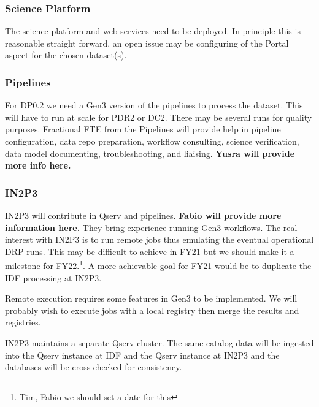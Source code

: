 \subsubsection{ Science Platform}
The science platform and web services need to be deployed. In principle this is reasonable straight forward, an open issue may be configuring of the Portal aspect for the chosen  dataset(s).

\subsubsection{ Pipelines }
For DP0.2 we need a Gen3 version of the pipelines to process the dataset. This will have to run at scale for PDR2 or DC2. There may be several runs for quality purposes.
Fractional FTE from the Pipelines will provide help in pipeline configuration, data repo preparation, workflow consulting, science verification, data model documenting, troubleshooting, and liaising.
{\bf Yusra will provide more info here.}

\subsubsection{ IN2P3}\label{sec:in2p3}
IN2P3 will contribute in Qserv and pipelines. {\bf Fabio will provide more information here.}
They bring experience running Gen3 workflows. The real interest with IN2P3 is to run remote jobs thus emulating the eventual operational DRP runs. This may be difficult to achieve in FY21 but we should make it a milestone for FY22.\footnote{Tim, Fabio we should set a date for this}. A more achievable goal for FY21 would be to duplicate the IDF processing at IN2P3.

Remote execution requires some  features in Gen3 to be implemented. We will probably wish to execute jobs with a local registry then merge the results and registries.

IN2P3 maintains a separate Qserv cluster.
The same catalog data will be ingested into the Qserv instance at IDF and the Qserv instance at IN2P3 and the databases will be cross-checked for consistency.
